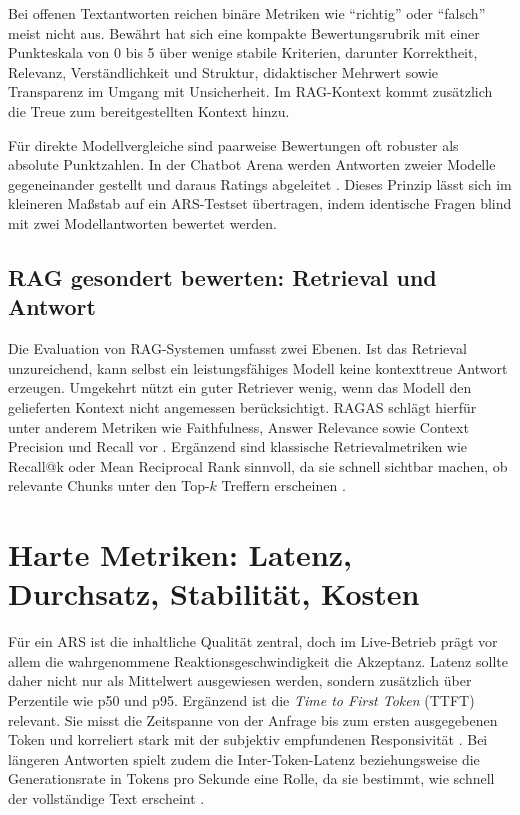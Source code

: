Bei offenen Textantworten reichen binäre Metriken wie \enquote{richtig} oder \enquote{falsch} meist nicht aus. Bewährt hat sich eine kompakte Bewertungsrubrik mit einer Punkteskala von 0 bis 5 über wenige stabile Kriterien, darunter Korrektheit, Relevanz, Verständlichkeit und Struktur, didaktischer Mehrwert sowie Transparenz im Umgang mit Unsicherheit. Im RAG-Kontext kommt zusätzlich die Treue zum bereitgestellten Kontext hinzu.

Für direkte Modellvergleiche sind paarweise Bewertungen oft robuster als absolute Punktzahlen. In der Chatbot Arena werden Antworten zweier Modelle gegeneinander gestellt und daraus Ratings abgeleitet \parencite{lmsys-arena,mtbench-arxiv,mtbench-neurips}. Dieses Prinzip lässt sich im kleineren Maßstab auf ein ARS-Testset übertragen, indem identische Fragen blind mit zwei Modellantworten bewertet werden.

\subsection{RAG gesondert bewerten: Retrieval und Antwort}

Die Evaluation von RAG-Systemen umfasst zwei Ebenen. Ist das Retrieval unzureichend, kann selbst ein leistungsfähiges Modell keine kontexttreue Antwort erzeugen. Umgekehrt nützt ein guter Retriever wenig, wenn das Modell den gelieferten Kontext nicht angemessen berücksichtigt. RAGAS schlägt hierfür unter anderem Metriken wie Faithfulness, Answer Relevance sowie Context Precision und Recall vor \parencite{ragas-arxiv,ragas-acl}. Ergänzend sind klassische Retrievalmetriken wie Recall@k oder Mean Reciprocal Rank sinnvoll, da sie schnell sichtbar machen, ob relevante Chunks unter den Top-$k$ Treffern erscheinen \parencite{weaviate-retrieval-metrics,pinecone-rag-eval}.

\section{Harte Metriken: Latenz, Durchsatz, Stabilität, Kosten}

Für ein ARS ist die inhaltliche Qualität zentral, doch im Live-Betrieb prägt vor allem die wahrgenommene Reaktionsgeschwindigkeit die Akzeptanz. Latenz sollte daher nicht nur als Mittelwert ausgewiesen werden, sondern zusätzlich über Perzentile wie p50 und p95. Ergänzend ist die \emph{Time to First Token} (TTFT) relevant. Sie misst die Zeitspanne von der Anfrage bis zum ersten ausgegebenen Token und korreliert stark mit der subjektiv empfundenen Responsivität \parencite{nvidia-nim-metrics,anyscale-metrics}. Bei längeren Antworten spielt zudem die Inter-Token-Latenz beziehungsweise die Generationsrate in Tokens pro Sekunde eine Rolle, da sie bestimmt, wie schnell der vollständige Text erscheint \parencite{anyscale-metrics}.

